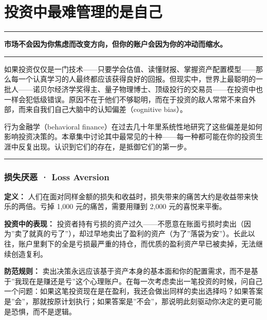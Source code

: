 \documentclass[a4paper,11pt,oneside,fontset=none,UTF8,zihao=-4]{ctexbook}
\begin{document}
\chapter{投资中最难管理的是自己}\label{ux6295ux8d44ux4e2dux6700ux96beux7ba1ux7406ux7684ux662fux81eaux5df1}

\begin{center}{\color{dh-bronze}\rule{0.2\textwidth}{0.5pt}}\end{center}

\begin{dhquote}
\textbf{市场不会因为你焦虑而改变方向，但你的账户会因为你的冲动而缩水。}
\end{dhquote}

\begin{center}{\color{dh-bronze}\rule{0.2\textwidth}{0.5pt}}\end{center}

如果投资仅仅是一门技术------只要学会估值、读懂财报、掌握资产配置模型------那么每一个认真学习的人最终都应该获得良好的回报。但现实中，世界上最聪明的一批人------诺贝尔经济学奖得主、量子物理博士、顶级投行的交易员------在投资中也一样会犯低级错误。原因不在于他们不够聪明，而在于投资的敌人常常不来自外部，而来自我们自己大脑中的认知偏差（cognitive
bias）。

行为金融学（behavioral
finance）在过去几十年里系统性地研究了这些偏差是如何影响投资决策的。本章集中讨论其中最常见的十种------每一种都可能在你的投资生涯中反复出现。认识到它们的存在，是抵御它们的第一步。

\begin{center}{\color{dh-bronze}\rule{0.2\textwidth}{0.5pt}}\end{center}

\subsection{损失厌恶 · Loss
Aversion}\label{ux635fux5931ux538cux6076-loss-aversion}

\textbf{定义：}
人们在面对同样金额的损失和收益时，损失带来的痛苦大约是收益带来快乐的两倍。亏掉
1,000 元的痛苦，需要用赚到 2,000 元的喜悦来平衡。

\textbf{投资中的表现：}
投资者持有亏损的资产过久------不愿意在账面亏损时卖出（因为''卖了就真的亏了''），却过早地卖出了盈利的资产（为了''落袋为安''）。长此以往，账户里剩下的全是亏损最严重的持仓，而优质的盈利资产早已被卖掉，无法继续创造复利。

\textbf{防范规则：}
卖出决策永远应该基于资产本身的基本面和你的配置需求，而不是基于''我现在是赚还是亏''这个心理账户。在每一次考虑卖出一笔投资的时候，问自己一个问题：如果这笔投资现在是在盈利，我还会做出同样的卖出选择吗？如果答案是''会''，那就按原计划执行；如果答案是''不会''，那说明此刻驱动你决定的更可能是恐惧，而不是逻辑。
\end{document}

